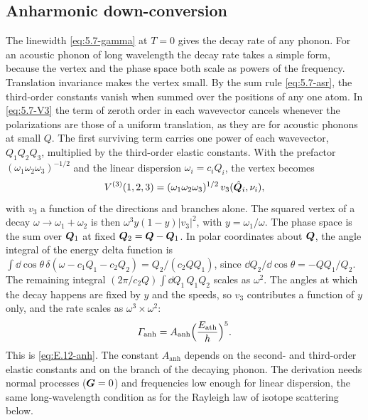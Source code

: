 \subsection{Anharmonic down-conversion}\label{sec:20.2-anh}

The linewidth \cref{eq:5.7-gamma} at $T = 0$ gives the decay rate of any phonon. For an acoustic phonon of long wavelength the decay rate takes a simple form, because the vertex and the phase space both scale as powers of the frequency. Translation invariance makes the vertex small. By the sum rule \cref{eq:5.7-asr}, the third-order constants vanish when summed over the positions of any one atom. In \cref{eq:5.7-V3} the term of zeroth order in each wavevector cancels whenever the polarizations are those of a uniform translation, as they are for acoustic phonons at small $Q$. The first surviving term carries one power of each wavevector, $Q_1Q_2Q_3$, multiplied by the third-order elastic constants. With the prefactor $(\omega_1\omega_2\omega_3)^{-1/2}$ and the linear dispersion $\omega_i = c_iQ_i$, the vertex becomes
\begin{equation}
  V^{(3)}(1,2,3) = (\omega_1\omega_2\omega_3)^{1/2}\,v_3(\hat{\bm{Q}}_i, \nu_i) ,
  \label{eq:20.2-V3}
\end{equation}
with $v_3$ a function of the directions and branches alone. The squared vertex of a decay $\omega \to \omega_1 + \omega_2$ is then $\omega^3y(1 - y)|v_3|^2$, with $y = \omega_1/\omega$. The phase space is the sum over $\bm{Q}_1$ at fixed $\bm{Q}_2 = \bm{Q} - \bm{Q}_1$. In polar coordinates about $\bm{Q}$, the angle integral of the energy delta function is $\int\dd\cos\theta\,\delta(\omega - c_1Q_1 - c_2Q_2) = Q_2/(c_2QQ_1)$, since $\dd Q_2/\dd\cos\theta = -QQ_1/Q_2$. The remaining integral $(2\pi/c_2Q)\int\dd Q_1\,Q_1Q_2$ scales as $\omega^2$. The angles at which the decay happens are fixed by $y$ and the speeds, so $v_3$ contributes a function of $y$ only, and the rate scales as $\omega^3\times\omega^2$:
\begin{equation}
  \varGamma_{\mathrm{anh}} = A_{\mathrm{anh}}\Bigl(\frac{E_{\mathrm{ath}}}{h}\Bigr)^5 .
  \label{eq:20.2-anh}
\end{equation}
This is \cref{eq:E.12-anh}. The constant $A_{\mathrm{anh}}$ depends on the second- and third-order elastic constants and on the branch of the decaying phonon. The derivation needs normal processes ($\bm{G} = 0$) and frequencies low enough for linear dispersion, the same long-wavelength condition as for the Rayleigh law of isotope scattering below.

